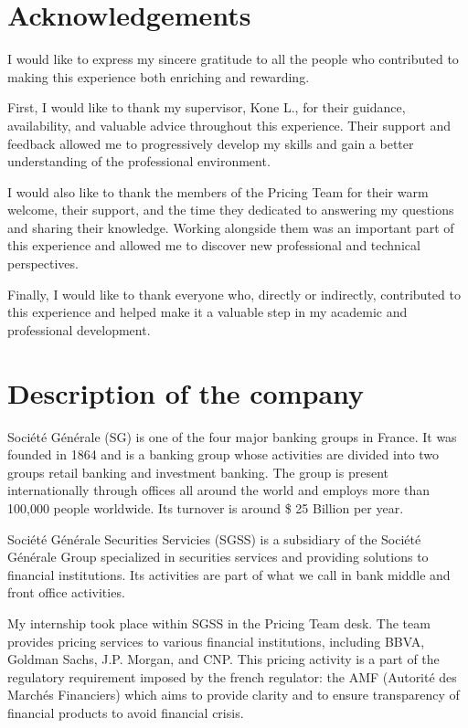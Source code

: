 \documentclass{article}
\begin{document}
\tableofcontents



\clearpage

\section*{Acknowledgements}

I would like to express my sincere gratitude to all the people who contributed to making this experience both enriching and rewarding.

First, I would like to thank my supervisor, Kone L., for their guidance, availability, and valuable advice throughout this experience. Their support and feedback allowed me to progressively develop my skills and gain a better understanding of the professional environment.

I would also like to thank the members of the Pricing Team for their warm welcome, their support, and the time they dedicated to answering my questions and sharing their knowledge. Working alongside them was an important part of this experience and allowed me to discover new professional and technical perspectives.


Finally, I would like to thank everyone who, directly or indirectly, contributed to this experience and helped make it a valuable step in my academic and professional development.
\clearpage

\section{Description of the company}

Société Générale (SG) is one of the four major banking groups in France. It was founded in 1864 and is a banking group whose activities are divided into two groups retail banking and investment banking. The group is present internationally through offices all around the world and employs more than 100,000 people worldwide. Its turnover is around \$ 25 Billion per year. 

Société Générale Securities Servicies (SGSS) is a subsidiary of the Société Générale Group specialized in securities services and providing solutions to financial institutions. Its activities are part of what we call in bank middle and front office activities.

My internship took place within SGSS in the Pricing Team desk. The team provides pricing services to various financial institutions, including BBVA, Goldman Sachs, J.P. Morgan, and CNP. This pricing activity is a part of the regulatory requirement imposed by the french regulator: the AMF (Autorité des Marchés Financiers) which aims to provide clarity and to ensure transparency of financial products to avoid financial crisis.
\end{document}
